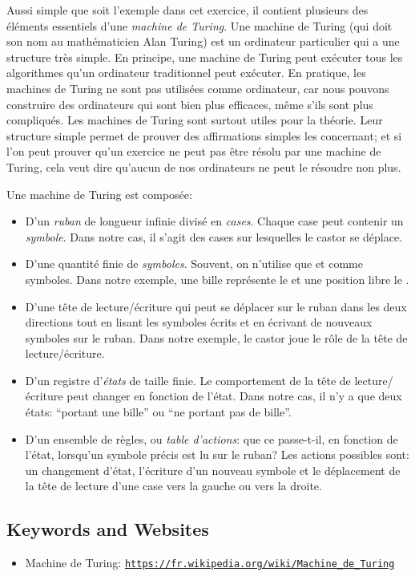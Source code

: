 \documentclass[a4paper,11pt]{report}
\newcommand{\BrochureUrlText}[1]{\texttt{#1}}
\newcommand{\BrochureInlineCode}[1]{{\ttfamily #1}}
\begin{document}
Aussi simple que soit l’exemple dans cet exercice, il contient plusieurs des éléments essentiels d’une \emph{machine de Turing}.
Une machine de Turing (qui doit son nom au mathématicien Alan Turing) est un ordinateur particulier qui a une structure très simple. En principe, une machine de Turing peut exécuter tous les algorithmes qu’un ordinateur traditionnel peut exécuter. En pratique, les machines de Turing ne sont pas utilisées comme ordinateur, car nous pouvons construire des ordinateurs qui sont bien plus efficaces, même s’ils sont plus compliqués. Les machines de Turing sont surtout utiles pour la théorie. Leur structure simple permet de prouver des affirmations simples les concernant; et si l’on peut prouver qu’un exercice ne peut pas être résolu par une machine de Turing, cela veut dire qu’aucun de nos ordinateurs ne peut le résoudre non plus.

Une machine de Turing est composée:

\begin{itemize}
  \item D’un \emph{ruban} de longueur infinie divisé en \emph{cases}. Chaque case peut contenir un \emph{symbole}. Dans notre cas, il s’agit des cases sur lesquelles le castor se déplace.
  \item D’une quantité finie de \emph{symboles}. Souvent, on n’utilise que \BrochureInlineCode{0} et \BrochureInlineCode{1} comme symboles. Dans notre exemple, une bille représente le \BrochureInlineCode{1} et une position libre le \BrochureInlineCode{0}.
  \item D’une tête de lecture/écriture qui peut se déplacer sur le ruban dans les deux directions tout en lisant les symboles écrits et en écrivant de nouveaux symboles sur le ruban. Dans notre exemple, le castor joue le rôle de la tête de lecture/écriture.
  \item D’un registre d’\emph{états} de taille finie. Le comportement de la tête de lecture/écriture peut changer en fonction de l’état. Dans notre cas, il n’y a que deux états: “portant une bille” ou “ne portant pas de bille”.
  \item D’un ensemble de règles, ou \emph{table d’actions}: que ce passe-t-il, en fonction de l’état, lorsqu’un symbole précis est lu sur le ruban? Les actions possibles sont: un changement d’état, l’écriture d’un nouveau symbole et le déplacement de la tête de lecture d’une case vers la gauche ou vers la droite.
\end{itemize}

{\raggedright

\subsection*{Keywords and Websites}

\begin{itemize}
  \item Machine de Turing: \href{https://fr.wikipedia.org/wiki/Machine_de_Turing}{\BrochureUrlText{https://fr.wikipedia.org/wiki/Machine\_de\_Turing}}
\end{itemize}


}
\end{document}
